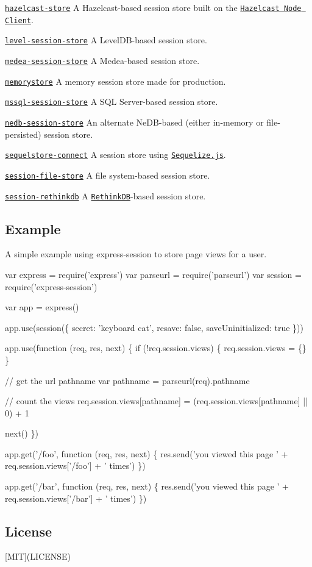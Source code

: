 \href{https://www.npmjs.com/package/hazelcast-store}{\tt hazelcast-\/store} A Hazelcast-\/based session store built on the \href{https://www.npmjs.com/package/hazelcast-client}{\tt Hazelcast Node Client}.

\href{https://www.npmjs.com/package/level-session-store}{\tt level-\/session-\/store} A Level\+D\+B-\/based session store.

\href{https://www.npmjs.com/package/medea-session-store}{\tt medea-\/session-\/store} A Medea-\/based session store.

\href{https://www.npmjs.com/package/memorystore}{\tt memorystore} A memory session store made for production.

\href{https://www.npmjs.com/package/mssql-session-store}{\tt mssql-\/session-\/store} A S\+QL Server-\/based session store.

\href{https://www.npmjs.com/package/nedb-session-store}{\tt nedb-\/session-\/store} An alternate Ne\+D\+B-\/based (either in-\/memory or file-\/persisted) session store.

\href{https://www.npmjs.com/package/sequelstore-connect}{\tt sequelstore-\/connect} A session store using \href{http://sequelizejs.com/}{\tt Sequelize.\+js}.

\href{https://www.npmjs.com/package/session-file-store}{\tt session-\/file-\/store} A file system-\/based session store.

\href{https://www.npmjs.com/package/session-rethinkdb}{\tt session-\/rethinkdb} A \href{http://rethinkdb.com/}{\tt Rethink\+DB}-\/based session store.

\subsection*{Example}

A simple example using {\ttfamily express-\/session} to store page views for a user.


\begin{DoxyCode}
var express = require('express')
var parseurl = require('parseurl')
var session = require('express-session')

var app = express()

app.use(session(\{
  secret: 'keyboard cat',
  resave: false,
  saveUninitialized: true
\}))

app.use(function (req, res, next) \{
  if (!req.session.views) \{
    req.session.views = \{\}
  \}

  // get the url pathname
  var pathname = parseurl(req).pathname

  // count the views
  req.session.views[pathname] = (req.session.views[pathname] || 0) + 1

  next()
\})

app.get('/foo', function (req, res, next) \{
  res.send('you viewed this page ' + req.session.views['/foo'] + ' times')
\})

app.get('/bar', function (req, res, next) \{
  res.send('you viewed this page ' + req.session.views['/bar'] + ' times')
\})
\end{DoxyCode}


\subsection*{License}

\mbox{[}M\+IT\mbox{]}(L\+I\+C\+E\+N\+SE) 
